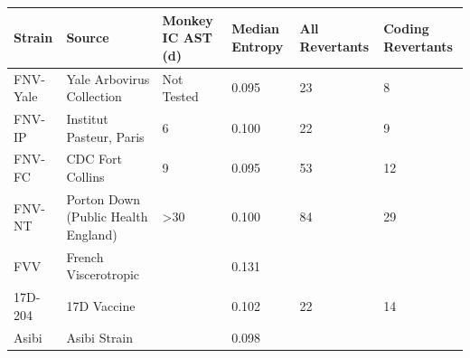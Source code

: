 \footnotesize
\begin{tabu} to \columnwidth {X[.9,l]X[1.7,l]X[l]X[l]X[l]X[l]}

	\rowfont[1]{\bfseries}
	\toprule
Strain   & Source                              & Monkey IC AST (d) & Median Entropy & All \newline Revertants & Coding \newline Revertants \\ \midrule
FNV-Yale & Yale Arbovirus Collection           & Not Tested        & 0.095          & 23         & 8             \\
FNV-IP   & Institut Pasteur, Paris             & 6                 & 0.100          & 22         & 9             \\
FNV-FC   & CDC Fort Collins                    & 9                 & 0.095          & 53         & 12            \\
FNV-NT   & Porton Down (Public Health England) & \textgreater30    & 0.100          & 84         & 29            \\
FVV      & French Viscerotropic                &                   & 0.131          &            &               \\
17D-204  & 17D Vaccine                         &                   & 0.102              & 22         & 14            \\
Asibi    & Asibi Strain                        &                   & 0.098          &            &               \\ \bottomrule

	\end{tabu}